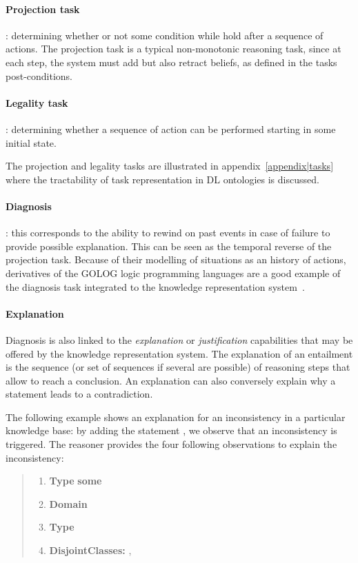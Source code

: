 \paragraph{Projection task}: determining whether or not some condition while
hold after a sequence of actions. The projection task is a typical
non-monotonic reasoning task, since at each step, the system must add but also
retract beliefs, as defined in the tasks post-conditions.

\paragraph{Legality task}: determining whether a sequence of action can be
performed starting in some initial state.

The projection and legality tasks are illustrated in
appendix~\ref{appendix|tasks} where the tractability of task representation in
DL ontologies is discussed.

\paragraph{Diagnosis}: this corresponds to the ability to rewind on past events
in case of failure to provide possible explanation. This can be seen as the
temporal reverse of the projection task. Because of their modelling of
situations as an history of actions, derivatives of the GOLOG logic programming
languages are a good example of the diagnosis task integrated to the knowledge
representation system~\cite{Gspandl2011}.

\paragraph{Explanation} Diagnosis is also linked to the \emph{explanation} or
\emph{justification} capabilities that may be offered by the knowledge
representation system. The explanation of an entailment is the sequence (or set
of sequences if several are possible) of reasoning steps that allow to reach a
conclusion. An explanation can also conversely explain why a statement leads to
a contradiction.

The following example shows an explanation for an inconsistency in a particular
knowledge base: by adding the statement , we
observe that an inconsistency is triggered. The reasoner provides the four
following observations to explain the inconsistency:

\begin{quote}
\scriptsize
\begin{enumerate}
    \item {} {\bf Type}  {\bf some} 
    \item {} {\bf Domain} 
    \item {} {\bf Type} 
    \item {\bf DisjointClasses:} , 
\end{enumerate}
\normalsize
\end{quote}

